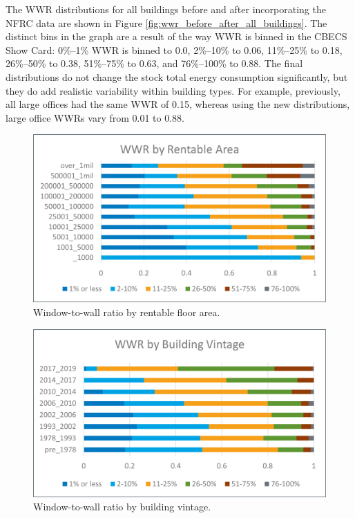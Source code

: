 The WWR distributions for all buildings before and after incorporating the NFRC data are shown in Figure \ref{fig:wwr_before_after_all_buildings}. The distinct bins in the graph are a result of the way WWR is binned in the CBECS Show Card: 0\%--1\% WWR is binned to 0.0, 2\%--10\% to 0.06, 11\%--25\% to 0.18, 26\%--50\% to 0.38, 51\%--75\% to 0.63, and 76\%--100\% to 0.88. The final distributions do not change the stock total energy consumption significantly, but they do add realistic variability within building types. For example, previously, all large offices had the same WWR of 0.15, whereas using the new distributions, large office WWRs vary from 0.01 to 0.88.

    \begin{figure} [h]
    \centering \includegraphics[width=\textwidth]{figures/wwr_by_rentable_area.png}
    \caption[Window-to-wall ratio by rentable floor area]{Window-to-wall ratio by rentable floor area.}
    \label{fig:wwr_by_rentable_area}
    \end{figure} 

\pagebreak

    \begin{figure} [h]
    \centering \includegraphics[width=\textwidth]{figures/wwr_by_building_vintage.png}
    \caption[Window-to-wall ratio by building vintage]{Window-to-wall ratio by building vintage.}
    \label{fig:wwr_by_building_vintage}
    \end{figure} 

